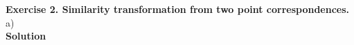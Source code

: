 \documentclass[letterpaper, 11pt]{article}
\begin{document}
\textbf{Exercise 2. Similarity transformation from two point correspondences.}\\
a)\\
\textbf{Solution}
\end{document}
